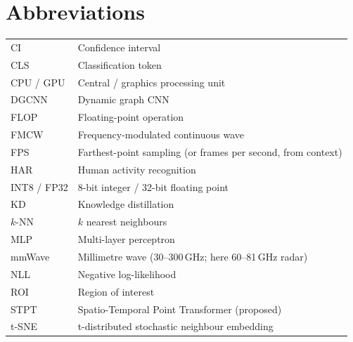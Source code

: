 \documentclass[12pt,a4paper,oneside]{report}
\begin{document}
\chapter*{Abbreviations}
\begin{tabular}{@{}ll@{}}
CI & Confidence interval \\
CLS & Classification token \\
CPU / GPU & Central / graphics processing unit \\
DGCNN & Dynamic graph CNN \\
FLOP & Floating-point operation \\
FMCW & Frequency-modulated continuous wave \\
FPS & Farthest-point sampling (or frames per second, from context) \\
HAR & Human activity recognition \\
INT8 / FP32 & 8-bit integer / 32-bit floating point \\
KD & Knowledge distillation \\
$k$-NN & $k$ nearest neighbours \\
MLP & Multi-layer perceptron \\
mmWave & Millimetre wave (30--300\,GHz; here 60--81\,GHz radar) \\
NLL & Negative log-likelihood \\
ROI & Region of interest \\
STPT & Spatio-Temporal Point Transformer (proposed) \\
t-SNE & t-distributed stochastic neighbour embedding \\
\end{tabular}

\clearpage
{}



















\appendix

\end{document}
